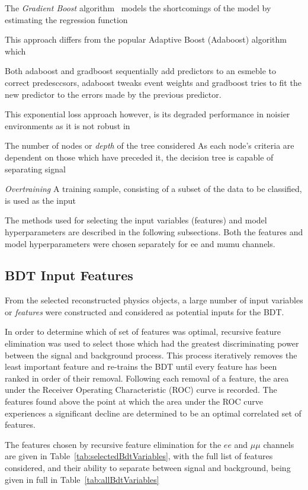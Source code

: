 The \emph{Gradient Boost} algorithm~\cite{Friedman:GradientBoosting} models the shortcomings of the model by estimating the regression function 

This approach differs from the popular Adaptive Boost (Adaboost) algorithm which 

Both adaboost and gradboost sequentially add predictors to an esmeble to correct predesccsors, adaboost tweaks event weights and gradboost tries to fit the new predictor to the errors made by the previous predictor.

This exponential loss approach however, is its degraded performance in noisier environments as it is not robust in 	

The number of nodes or \emph{depth} of the tree considered
As each node's criteria are dependent on those which have preceded it, the decision tree is capable of separating signal 

\emph{Overtraining}
A training sample, consisting of a subset of the data to be classified, is used as the input 




The methods used for selecting the input variables (features) and model hyperparameters are described in the following subsections.
Both the features and model hyperparameters were chosen separately for ee and mumu channels.

\subsection{BDT Input Features}
From the selected reconstructed physics objects, a large number of input variables or \emph{features} were constructed and considered as potential inputs for the BDT.

In order to determine which of set of features was optimal, recursive feature elimination was used to select those which had the greatest discriminating power between the signal and background process.
This process iteratively removes the least important feature and re-trains the BDT until every feature has been ranked in order of their removal.
Following each removal of a feature, the area under the Receiver Operating Characteristic (ROC) curve is recorded.
The features found above the point at which the area under the ROC curve experiences a significant decline are determined to be an optimal correlated set of features.
 
The features chosen by recursive feature elimination for the $ee$ and $\mu\mu$ channels are given in Table~\ref{tab:selectedBdtVariables}, with the full list of features considered, and their ability to separate between signal and background, being given in full in Table~\ref{tab:allBdtVariables}

